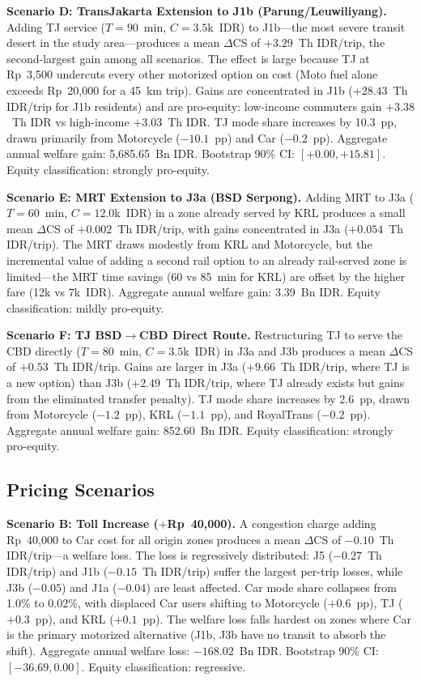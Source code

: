 \documentclass[12pt,a4paper]{article}
\begin{document}
\textbf{Scenario D: TransJakarta Extension to J1b (Parung/Leuwiliyang).}
Adding TJ service ($T = 90$~min, $C = 3.5$k~IDR) to J1b---the most severe transit desert in the study area---produces a mean $\Delta$CS of $+3.29$~Th IDR/trip, the second-largest gain among all scenarios. The effect is large because TJ at Rp~3,500 undercuts every other motorized option on cost (Moto fuel alone exceeds Rp~20,000 for a 45~km trip). Gains are concentrated in J1b ($+28.43$~Th IDR/trip for J1b residents) and are pro-equity: low-income commuters gain $+3.38$~Th IDR vs high-income $+3.03$~Th IDR. TJ mode share increases by 10.3~pp, drawn primarily from Motorcycle ($-10.1$~pp) and Car ($-0.2$~pp). Aggregate annual welfare gain: 5,685.65~Bn IDR. Bootstrap 90\% CI: $[+0.00, +15.81]$. Equity classification: strongly pro-equity.

\textbf{Scenario E: MRT Extension to J3a (BSD Serpong).}
Adding MRT to J3a ($T = 60$~min, $C = 12.0$k~IDR) in a zone already served by KRL produces a small mean $\Delta$CS of $+0.002$~Th IDR/trip, with gains concentrated in J3a ($+0.054$~Th IDR/trip). The MRT draws modestly from KRL and Motorcycle, but the incremental value of adding a second rail option to an already rail-served zone is limited---the MRT time savings (60 vs 85~min for KRL) are offset by the higher fare (12k vs 7k~IDR). Aggregate annual welfare gain: 3.39~Bn IDR. Equity classification: mildly pro-equity.

\textbf{Scenario F: TJ BSD$\to$CBD Direct Route.}
Restructuring TJ to serve the CBD directly ($T = 80$~min, $C = 3.5$k~IDR) in J3a and J3b produces a mean $\Delta$CS of $+0.53$~Th IDR/trip. Gains are larger in J3a ($+9.66$~Th IDR/trip, where TJ is a new option) than J3b ($+2.49$~Th IDR/trip, where TJ already exists but gains from the eliminated transfer penalty). TJ mode share increases by 2.6~pp, drawn from Motorcycle ($-1.2$~pp), KRL ($-1.1$~pp), and RoyalTrans ($-0.2$~pp). Aggregate annual welfare gain: 852.60~Bn IDR. Equity classification: strongly pro-equity.

\subsection{Pricing Scenarios}

\textbf{Scenario B: Toll Increase ($+$Rp~40,000).}
A congestion charge adding Rp~40,000 to Car cost for all origin zones produces a mean $\Delta$CS of $-0.10$~Th IDR/trip---a welfare loss. The loss is regressively distributed: J5 ($-0.27$~Th IDR/trip) and J1b ($-0.15$~Th IDR/trip) suffer the largest per-trip losses, while J3b ($-0.05$) and J1a ($-0.04$) are least affected. Car mode share collapses from 1.0\% to 0.02\%, with displaced Car users shifting to Motorcycle ($+0.6$~pp), TJ ($+0.3$~pp), and KRL ($+0.1$~pp). The welfare loss falls hardest on zones where Car is the primary motorized alternative (J1b, J3b have no transit to absorb the shift). Aggregate annual welfare loss: $-168.02$~Bn IDR. Bootstrap 90\% CI: $[-36.69, 0.00]$. Equity classification: regressive.
\end{document}
